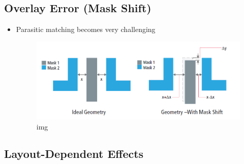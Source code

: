 \documentclass[
]{article}
\begin{document}
\hypertarget{overlay-error-mask-shift}{%
\subsection{Overlay Error (Mask Shift)}\label{overlay-error-mask-shift}}

\begin{itemize}
\item
  Parasitic matching becomes very challenging

  \begin{figure}
  \centering
  \includegraphics{lec04.files/img002.png}
  \caption{img}
  \end{figure}
\end{itemize}

\hypertarget{layout-dependent-effects}{%
\subsection{Layout-Dependent Effects}\label{layout-dependent-effects}}
\end{document}
